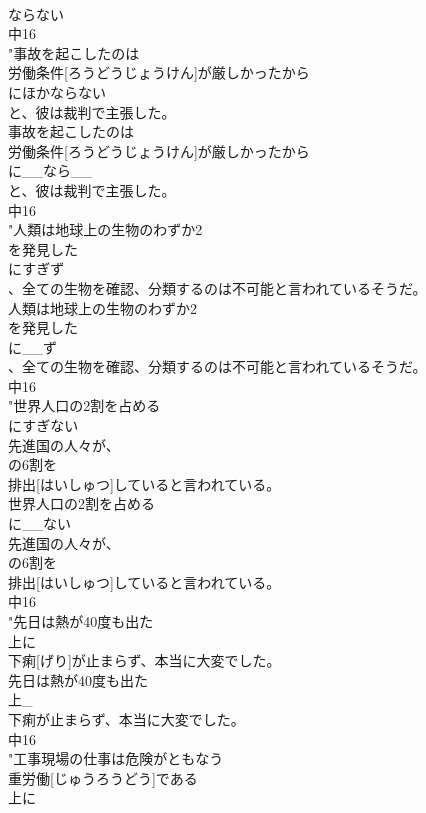 \documentclass[8pt]{extreport}
\begin{document}
\begin{CJK}{UTF8}{min}
\\	ならない
\\	中16
\\	"事故を起こしたのは
\\	労働条件[ろうどうじょうけん]が厳しかったから
\\	にほかならない
\\	と、彼は裁判で主張した。
\\	事故を起こしたのは
\\	労働条件[ろうどうじょうけん]が厳しかったから
\\	に__なら__
\\	と、彼は裁判で主張した。
\\	中16
\\	"人類は地球上の生物のわずか2
\\	を発見した
\\	にすぎず
\\	、全ての生物を確認、分類するのは不可能と言われているそうだ。
\\	人類は地球上の生物のわずか2
\\	を発見した
\\	に__ず
\\	、全ての生物を確認、分類するのは不可能と言われているそうだ。
\\	中16
\\	"世界人口の2割を占める
\\	にすぎない
\\	先進国の人々が、
\\	の6割を
\\	排出[はいしゅつ]していると言われている。
\\	世界人口の2割を占める
\\	に__ない
\\	先進国の人々が、
\\	の6割を
\\	排出[はいしゅつ]していると言われている。
\\	中16
\\	"先日は熱が40度も出た
\\	上に
\\	下痢[げり]が止まらず、本当に大変でした。
\\	先日は熱が40度も出た
\\	上_
\\	下痢が止まらず、本当に大変でした。
\\	中16
\\	"工事現場の仕事は危険がともなう
\\	重労働[じゅうろうどう]である
\\	上に

\end{CJK}
\end{document}
